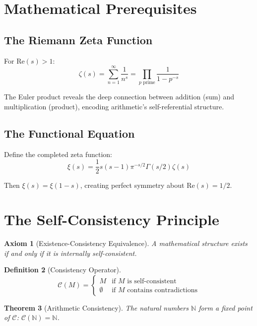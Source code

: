 \documentclass[12pt]{article}
\newtheorem{theorem}{Theorem}[section]
\newtheorem{definition}[theorem]{Definition}
\newtheorem{axiom}[theorem]{Axiom}
\newcommand{\N}{\mathbb{N}}
\begin{document}
\section{Mathematical Prerequisites}

\subsection{The Riemann Zeta Function}

For $\text{Re}(s) > 1$:
\begin{equation}
\zeta(s) = \sum_{n=1}^{\infty} \frac{1}{n^s} = \prod_{p \text{ prime}} \frac{1}{1-p^{-s}}
\end{equation}

The Euler product reveals the deep connection between addition (sum) and multiplication (product), encoding arithmetic's self-referential structure.

\subsection{The Functional Equation}

Define the completed zeta function:
\begin{equation}
\xi(s) = \frac{1}{2}s(s-1)\pi^{-s/2}\Gamma(s/2)\zeta(s)
\end{equation}

Then $\xi(s) = \xi(1-s)$, creating perfect symmetry about $\text{Re}(s) = 1/2$.

\section{The Self-Consistency Principle}

\begin{axiom}[Existence-Consistency Equivalence]
A mathematical structure exists if and only if it is internally self-consistent.
\end{axiom}

\begin{definition}[Consistency Operator]
$$\mathcal{C}(M) = \begin{cases} 
  M & \text{if } M \text{ is self-consistent} \\
  \emptyset & \text{if } M \text{ contains contradictions}
\end{cases}$$
\end{definition}

\begin{theorem}[Arithmetic Consistency]
The natural numbers $\N$ form a fixed point of $\mathcal{C}$: $\mathcal{C}(\N) = \N$.
\end{theorem}
\end{document}
